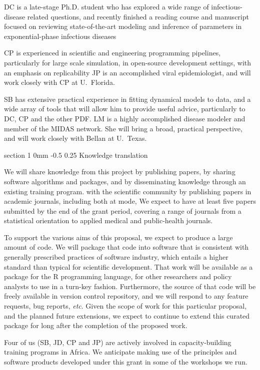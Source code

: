 \documentclass[12pt]{article}
\makeatletter
\renewcommand{\section}{\@startsection  %
{section}%
{1}%
{0mm}%
{-0.5\baselineskip}%
{0.25\baselineskip}%
{\normalfont\Large\bfseries}}%
\makeatother
\begin{document}
DC is a late-stage Ph.D. student who has explored a wide range of infectious-disease related questions, and recently finished a reading course and manuscript focused on reviewing state-of-the-art modeling and inference of parameters in exponential-phase infectious diseases

CP is experienced in scientific and engineering programming pipelines, particularly for large scale simulation, in open-source development settings, with an emphasis on replicability 
JP is an accomplished viral epidemiologist, and will work closely with CP at U.\ Florida.

SB has extensive practical experience in fitting dynamical models to data, and a wide array of tools that will allow him to provide useful advice, particularly to DC, CP and the other PDF.  
LM is a highly accomplished disease modeler and member of the MIDAS network. She will bring a broad, practical perspective, and will work closely with Bellan at U.\ Texas.

\section{Knowledge translation}

We will share knowledge from this project by publishing papers, by sharing software algorithms and packages, and by disseminating knowledge through an existing training program. with the scientific community by publishing papers in academic journals, including both at mode, We expect to have at least five papers submitted by the end of the grant period, covering a range of journals from a statistical orientation to applied medical and public-health journals.

To support the various aims of this proposal, we expect to produce a large amount of code.  We will package that code into software that is consistent with generally prescribed practices of software industry, which entails a higher standard than typical for scientific development.  That work will be available as a package for the R programming language, for other researchers and policy analysts to use in a turn-key fashion.  Furthermore, the source of that code will be freely available in version control repository, and we will respond to any feature requests, bug reports, {\em etc}.  Given the scope of work for this particular proposal, and the planned future extensions, we expect to continue to extend this curated package for long after the completion of the proposed work.

Four of us (SB, JD, CP and JP) are actively involved in capacity-building training programs in Africa. We anticipate making use of the principles and software products developed under this grant in some of the workshops we run.
\end{document}
